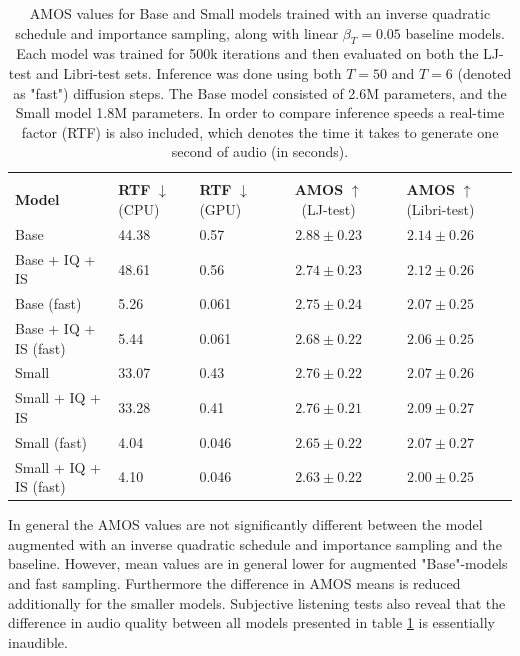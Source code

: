 \documentclass{report}
\begin{document}
\begin{table}[H]
\centering
\def\arraystretch{1.3}
\begin{tabular}{l l l c c c}
 \hline\hline
 \vspace{-0.5cm} \\
 \textbf{Model} & \textbf{RTF} $\downarrow$ (CPU) & \textbf{RTF} $\downarrow$ (GPU) & \textbf{AMOS} $\uparrow$ (LJ-test) & \textbf{AMOS} $\uparrow$ (Libri-test) \\ [0.5ex]
 \hline
 Base & 44.38 & 0.57 & $2.88 \pm 0.23$ & $2.14 \pm 0.26$ \\
 \hline
 Base + IQ + IS & 48.61 & 0.56 & $2.74 \pm 0.23$ & $2.12 \pm 0.26 $ \\
 \hline
 Base (fast) & 5.26 & 0.061 & $2.75 \pm 0.24$ & $ 2.07 \pm 0.25 $ \\
 \hline
 Base + IQ + IS (fast) & 5.44 & 0.061 & $2.68 \pm 0.22$ & $2.06 \pm 0.25$ \\
 \hline
 \hline
 Small & 33.07 & 0.43 & $2.76 \pm 0.22 $ & $2.07 \pm 0.26$ \\
 \hline
 Small + IQ + IS & 33.28 & 0.41 & $2.76 \pm 0.21$ & $2.09 \pm 0.27$ \\
 \hline
 Small (fast) & 4.04 & 0.046 & $2.65 \pm 0.22$ & $2.07 \pm 0.27$ \\
 \hline
 Small + IQ + IS (fast) & 4.10 & 0.046 & $ 2.63 \pm 0.22 $ & $2.00 \pm 0.25 $ \\
 \hline\hline
\end{tabular}
\caption{\onehalfspacing AMOS values for Base and Small models trained with an inverse quadratic schedule and importance sampling, along with linear $\beta_T=0.05$ baseline models. Each model was trained for 500k iterations and then evaluated on both the LJ-test and Libri-test sets. Inference was done using both $T=50$ and $T=6$ (denoted as "fast") diffusion steps. The Base model consisted of 2.6M parameters, and the Small model 1.8M parameters. In order to compare inference speeds a real-time factor (RTF) is also included, which denotes the time it takes to generate one second of audio (in seconds).} 
\label{table:smallamos}
\end{table}

In general the AMOS values are not significantly different between the model augmented with an inverse quadratic schedule and importance sampling and the baseline. However, mean values are in general lower for augmented "Base"-models and fast sampling. Furthermore the difference in AMOS means is reduced additionally for the smaller models. Subjective listening tests also reveal that the difference in audio quality between all models presented in table \ref{table:smallamos} is essentially inaudible.
\end{document}
